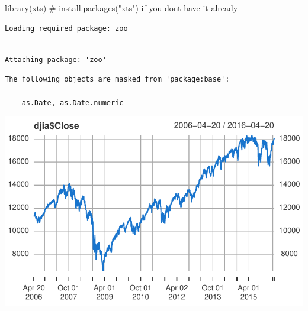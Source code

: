 \documentclass[
  letterpaper,
  DIV=11,
  numbers=noendperiod]{scrreprt}
\newenvironment{Shaded}{\begin{snugshade}}{\end{snugshade}}
\newcommand{\AttributeTok}[1]{\textcolor[rgb]{0.40,0.45,0.13}{#1}}
\newcommand{\CommentTok}[1]{\textcolor[rgb]{0.37,0.37,0.37}{#1}}
\newcommand{\DecValTok}[1]{\textcolor[rgb]{0.68,0.00,0.00}{#1}}
\newcommand{\FunctionTok}[1]{\textcolor[rgb]{0.28,0.35,0.67}{#1}}
\newcommand{\NormalTok}[1]{\textcolor[rgb]{0.00,0.23,0.31}{#1}}
\newcommand{\OtherTok}[1]{\textcolor[rgb]{0.00,0.23,0.31}{#1}}
\newcommand{\SpecialCharTok}[1]{\textcolor[rgb]{0.37,0.37,0.37}{#1}}
\begin{document}
\begin{Shaded}
\begin{Highlighting}[]
\FunctionTok{library}\NormalTok{(xts)     }\CommentTok{\# install.packages("xts") if you don\textquotesingle{}t have it already }
\end{Highlighting}
\end{Shaded}

\begin{verbatim}
Loading required package: zoo
\end{verbatim}

\begin{verbatim}

Attaching package: 'zoo'
\end{verbatim}

\begin{verbatim}
The following objects are masked from 'package:base':

    as.Date, as.Date.numeric
\end{verbatim}

\begin{Shaded}
\end{Shaded}

\includegraphics{LectureNotes/Lecture1_files/figure-pdf/ex-1-3-1.pdf}
\end{document}
